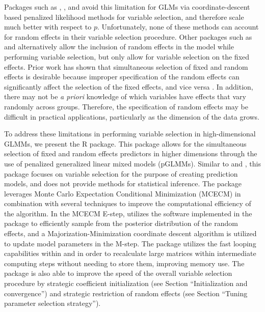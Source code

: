 Packages such as  \citep{glmnet2010},  \citep{ncvreg2011}, and  \citep{grpreg2015} avoid this limitation for GLMs via coordinate-descent based penalized likelihood methods for variable selection, and therefore scale much better with respect to $p$.  Unfortunately, none of these methods can account for random effects in their variable selection procedure. Other packages such as  \citep{glmmLassoManual} and  \citep{schelldorfer2014glmmLASSO} alternatively allow the inclusion of random effects in the model while performing variable selection, but only allow for variable selection on the fixed effects. Prior work has shown that simultaneous selection of fixed and random effects is desirable because improper specification of the random effects can significantly affect the selection of the fixed effects, and vice versa \citep{bondell2010joint}. In addition, there may not be \textit{a priori} knowledge of which variables have effects that vary randomly across groups.
Therefore, the specification of random effects may be difficult in practical applications, particularly as the dimension of the data grows.

To address these limitations in performing variable selection in high-dimensional GLMMs, we present the  R package. This package allows for the simultaneous selection of fixed and random effects predictors in higher dimensions through the use of penalized generalized linear mixed models (pGLMMs). Similar to  and , this package focuses on variable selection for the purpose of creating prediction models, and does not provide methods for statistical inference.
The package leverages Monte Carlo Expectation Conditional Minimization (MCECM) in combination with several techniques to improve the computational efficiency of the  algorithm. In the MCECM E-step,  utilizes the  software implemented in the  package to efficiently sample from the posterior distribution of the random effects, and a Majorization-Minimization coordinate descent algorithm is utilized to update model parameters in the M-step. The  package utilizes the fast looping capabilities within  and  in order to recalculate large matrices within intermediate computing steps without needing to store them, improving memory use. The  package is also able to improve the speed of the overall variable selection procedure by strategic coefficient initialization (see Section ``Initialization and convergence'') and strategic restriction of random effects (see Section ``Tuning parameter selection strategy''). 

